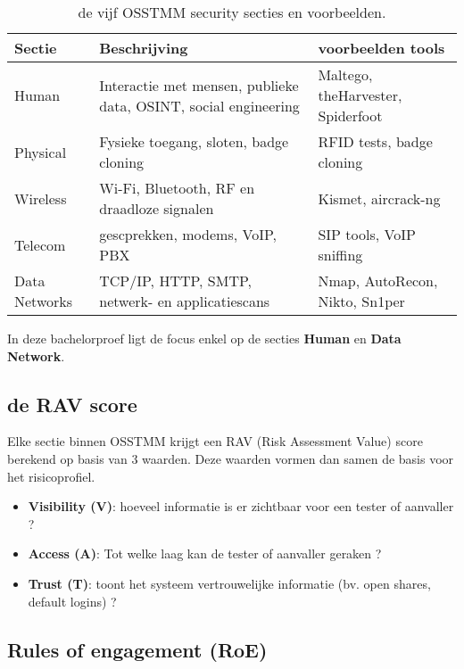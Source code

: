 \begin{table}[H]
    \centering
    \footnotesize
    \begin{tabularx}{\linewidth}{l X l}
      \toprule
      \textbf{Sectie} & \textbf{Beschrijving} & \textbf{voorbeelden tools} \\
      \midrule
      Human         & Interactie met mensen, publieke data, OSINT, social engineering   & Maltego, theHarvester, Spiderfoot \\
      Physical      & Fysieke toegang, sloten, badge cloning                            & RFID tests, badge cloning \\
      Wireless      & Wi-Fi, Bluetooth, RF en draadloze signalen                        & Kismet, aircrack-ng \\
      Telecom       & gescprekken, modems, VoIP, PBX                                    & SIP tools, VoIP sniffing \\
      Data Networks & TCP/IP, HTTP, SMTP, netwerk- en applicatiescans                   & Nmap, AutoRecon, Nikto, Sn1per \\
      \bottomrule
    \end{tabularx}
    \caption[OSSTMM secties]{\label{tab:channels}de vijf OSSTMM security secties en voorbeelden.}
\end{table}

In deze bachelorproef ligt de focus enkel op de secties \textbf{Human} en \textbf{Data Network}.

\subsection{de RAV score}

Elke sectie binnen OSSTMM krijgt een RAV (Risk Assessment Value) score berekend op basis van 3 waarden.
Deze waarden vormen dan samen de basis voor het risicoprofiel.

\begin{itemize}
    \item \textbf{Visibility (V)}: hoeveel informatie is er zichtbaar voor een tester of aanvaller ?
    \item \textbf{Access (A)}: Tot welke laag kan de tester of aanvaller geraken ?
    \item \textbf{Trust (T)}: toont het systeem vertrouwelijke informatie (bv. open shares, default logins) ?
\end{itemize}


\subsection{Rules of engagement (RoE)}

